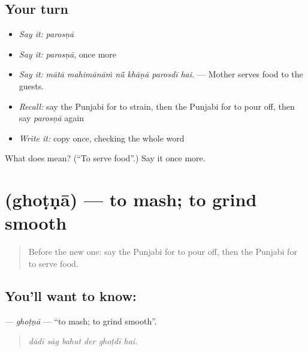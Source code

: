 \subsection*{Your turn}
\begin{itemize}
\raggedright
  \item \emph{Say it:} \emph{parosṇā}
  \item \emph{Say it:} \emph{parosṇā}, once more
  \item \emph{Say it:} \emph{mātā mahimānāṁ nū̃ khāṇā parosdī hai.} — Mother serves food to the guests.
  \item \emph{Recall:} say the Punjabi for to strain, then the Punjabi for to pour off, then say \emph{parosṇā} again
  \item \emph{Write it:} copy \textbf{} once, checking the whole word
\end{itemize}

\begin{tcolorbox}[breakable,colback=teal!4,colframe=teal!35!black,title={Before you move on}]
What does  mean? (\textquotedblleft{}To serve food\textquotedblright{}.) Say it once more.
\end{tcolorbox}
\section[\texorpdfstring{\pa{ਘੋਟਣਾ} (ghoṭṇā)}{ਘੋਟਣਾ (ghoṭṇā)}]{ (ghoṭṇā) — to mash; to grind smooth}

\label{lesson:PA-C244-ghotna}



\begin{quote}
Before the new one: say the Punjabi for to pour off, then the Punjabi for to serve food.
\end{quote}

\subsection*{You'll want to know: }
\textbf{} — \emph{ghoṭṇā} — \textquotedblleft{}to mash; to grind smooth\textquotedblright{}.

\begin{quote}
     
\end{quote}

\begin{quote}
\emph{dādī sāg bahut der ghoṭdī hai.}
\end{quote}

